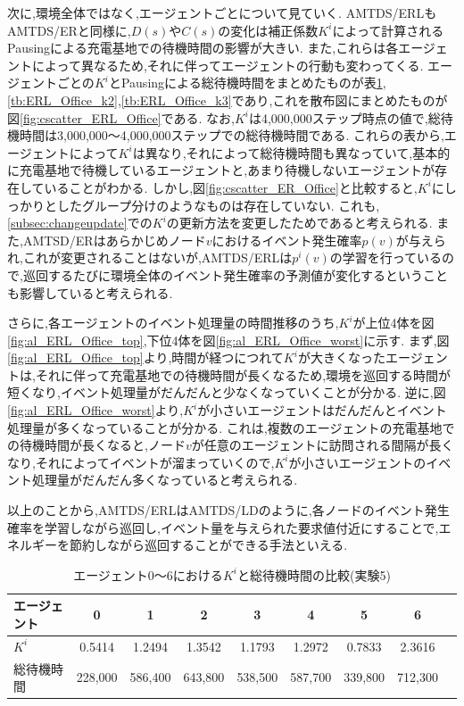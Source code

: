 \documentclass[12pt,a4j,twoside]{jarticle}
\begin{document}
  \par
  次に,環境全体ではなく,エージェントごとについて見ていく.
  AMTDS/ERLもAMTDS/ERと同様に,$D(s)$や$C(s)$の変化は補正係数$K^i$によって計算されるPausingによる充電基地での待機時間の影響が大きい.
  また,これらは各エージェントによって異なるため,それに伴ってエージェントの行動も変わってくる.
  エージェントごとの$K^i$とPausingによる総待機時間をまとめたものが表\ref{tb:ERL_Office_k1},\ref{tb:ERL_Office_k2},\ref{tb:ERL_Office_k3}であり,これを散布図にまとめたものが図\ref{fig:cscatter_ERL_Office}である.
  なお,$K^i$は4,000,000ステップ時点の値で,総待機時間は3,000,000～4,000,000ステップでの総待機時間である.
  これらの表から,エージェントによって$K^i$は異なり,それによって総待機時間も異なっていて,基本的に充電基地で待機しているエージェントと,あまり待機しないエージェントが存在していることがわかる.
  しかし,図\ref{fig:cscatter_ER_Office}と比較すると,$K^i$にしっかりとしたグループ分けのようなものは存在していない.
  これも,\ref{subsec:changeupdate}での$K^i$の更新方法を変更したためであると考えられる.
  また,AMTSD/ERはあらかじめノード$v$におけるイベント発生確率$p(v)$が与えられ,これが変更されることはないが,AMTDS/ERLは$p^i(v)$の学習を行っているので,巡回するたびに環境全体のイベント発生確率の予測値が変化するということも影響していると考えられる.
  
  \par
  さらに,各エージェントのイベント処理量の時間推移のうち,$K^i$が上位4体を図\ref{fig:al_ERL_Office_top},下位4体を図\ref{fig:al_ERL_Office_worst}に示す.
  まず,図\ref{fig:al_ERL_Office_top}より,時間が経つにつれて$K^i$が大きくなったエージェントは,それに伴って充電基地での待機時間が長くなるため,環境を巡回する時間が短くなり,イベント処理量がだんだんと少なくなっていくことが分かる.
  逆に,図\ref{fig:al_ERL_Office_worst}より,$K^i$が小さいエージェントはだんだんとイベント処理量が多くなっていることが分かる.
  これは,複数のエージェントの充電基地での待機時間が長くなると,ノード$v$が任意のエージェントに訪問される間隔が長くなり,それによってイベントが溜まっていくので,$K^i$が小さいエージェントのイベント処理量がだんだん多くなっていると考えられる.

  \par
  以上のことから,AMTDS/ERLはAMTDS/LDのように,各ノードのイベント発生確率を学習しながら巡回し,イベント量を与えられた要求値付近にすることで,エネルギーを節約しながら巡回することができる手法といえる.

  \begin{table}
    \centering
    \caption{エージェント0～6における$K^i$と総待機時間の比較(実験5)}
    \begin{tabular}{lcccccccr}\\ \hline
      エージェント & 0 & 1 & 2 & 3 & 4 & 5 & 6 \\ \hline
      $K^i$ & 0.5414 & 1.2494 & 1.3542 & 1.1793 & 1.2972 & 0.7833 & 2.3616 \\ \hline
      総待機時間 & 228,000 & 586,400 & 643,800 & 538,500 & 587,700 & 339,800 & 712,300 & \\ \hline      
    \end{tabular}
    \label{tb:ERL_Office_k1}
  \end{table}
\end{document}
